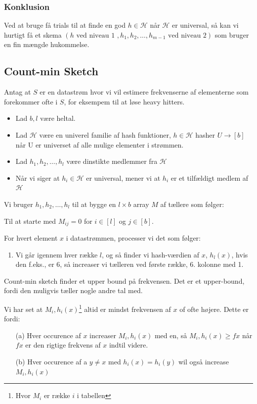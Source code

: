 \documentclass[11pt]{article}
\theoremstyle{definition}
\theoremstyle{remark}
\begin{document}
\subsubsection{Konklusion}

Ved at bruge få trials til at finde en god $h \in \mathcal{H}$ når $\mathcal{H}$ er universal, så kan vi hurtigt få et skema $(h \text{ ved niveau 1 }, h_{1}, h_{2}, \ldots, h_{m-1} \text{ ved niveau 2})$ som bruger en fin mængde hukommelse.


\subsection{Count-min Sketch}
\label{subsec:count-min-sketch}

Antag at $S$ er en datastrøm hvor vi vil estimere frekvenserne af elementerne som forekommer ofte i $S$, for eksempem til at løse heavy hitters.


\begin{itemize}
\item Lad $b,l$ være heltal.  
\item Lad $\mathcal{H}$ være en univerel familie af hash funktioner, $h \in \mathcal{H}$ hasher $U \rightarrow [b]$ når U er universet af alle mulige elementer i strømmen.
\item Lad $h_{1}, h_{2}, \ldots, h_{l}$ være dinstikte medlemmer fra $\mathcal{H}$
\item Når vi siger at $h_{i} \in \mathcal{H}$ er universal, mener vi at $h_{i}$ er et tilfældigt medlem af $\mathcal{H}$
\end{itemize} 

Vi bruger $h_{1}, h_{2}, \ldots, h_{l}$ til at bygge en $l \times b$ array $M$ af tællere som følger:

Til at starte med $M_{ij} = 0$ for $i \in [l]$ og $j \in [b]$.

For hvert element $x$ i datastrømmen, processer vi det som følger:
\begin{enumerate}
\item Vi går igennem hver række $l$, og så finder vi hash-værdien af $x$, $h_{l}(x)$, hvis den f.eks., er 6, så increaser vi tælleren ved første række, 6. kolonne med 1. 
\end{enumerate}

Count-min sketch finder et upper bound på frekvensen. Det er et upper-bound, fordi den muligvis tæller nogle andre tal med. 

Vi har set at $M_{i}, h_{i}(x)$\footnote{Hvor $M_{i}$ er række $i$ i tabellen} altid er mindst frekvensen af $x$ of ofte højere. Dette er fordi:
\begin{enumerate}
\item[(a)] Hver occurence af $x$ increaser $M_{i}, h_{i}(x)$ med en, så $M_{i}, h_{i}(x) \geq fx$ når $fx$ er den rigtige frekvens af $x$ indtil videre. 
\item[(b)] Hver occurence af a $y \neq x$ med $h_{i}(x) = h_{i}(y)$ wil også increase $M_{i}, h_{i}(x)$
\end{enumerate}
\end{document}
